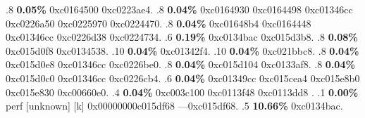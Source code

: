 \begin{profile}
{.8 \textbf{0.05\%} 0xc0164500\newline {} 0xc0223ae4. 
.8 \textbf{0.04\%} 0xc0164930\newline {} 0xc0164498\newline {} 0xc01346cc\newline {} 0xc0226a50\newline {} 0xc0225970\newline {} 0xc0224470. 
.8 \textbf{0.04\%} 0xc01648b4\newline {} 0xc0164448\newline {} 0xc01346cc\newline {} 0xc0226d38\newline {} 0xc0224734. 
.6 \textbf{0.19\%} 0xc0134bac\newline {} 0xc015d3b8. 
.8 \textbf{0.08\%} 0xc015d0f8\newline {} 0xc0134538. 
.10 \textbf{0.04\%} 0xc01342f4. 
.10 \textbf{0.04\%} 0xc021bbc8. 
.8 \textbf{0.04\%} 0xc015d0e8\newline {} 0xc01346cc\newline {} 0xc0226be0. 
.8 \textbf{0.04\%} 0xc015d104\newline {} 0xc0133af8. 
.8 \textbf{0.04\%} 0xc015d0c0\newline {} 0xc01346cc\newline {} 0xc0226cb4. 
.6 \textbf{0.04\%} 0xc01349cc\newline {} 0xc015cea4\newline {} 0xc015e8b0\newline {} 0xc015e830\newline {} 0xc00660e0. 
.4 \textbf{0.04\%} 0xc003c100\newline {} 0xc0113f48\newline {} 0xc0113dd8\newline {} . 
.1 \textbf{ 0.00\%} perf             [unknown]              [k] 0x00000000c015df68\newline {} ---0xc015df68. 
.5 \textbf{10.66\%} 0xc0134bac. 
}
\end{profile}
